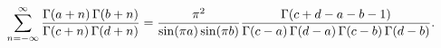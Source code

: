 \[\sum_{n=-\infty}^{\infty}\frac{\mathop{\Gamma\/}\nolimits\!\left(a+n\right)%
\mathop{\Gamma\/}\nolimits\!\left(b+n\right)}{\mathop{\Gamma\/}\nolimits\!%
\left(c+n\right)\mathop{\Gamma\/}\nolimits\!\left(d+n\right)}=\frac{\pi^{2}}{%
\mathop{\sin\/}\nolimits\!\left(\pi a\right)\mathop{\sin\/}\nolimits\!\left(%
\pi b\right)}\*\frac{\mathop{\Gamma\/}\nolimits\!\left(c+d-a-b-1\right)}{%
\mathop{\Gamma\/}\nolimits\!\left(c-a\right)\mathop{\Gamma\/}\nolimits\!\left(%
d-a\right)\mathop{\Gamma\/}\nolimits\!\left(c-b\right)\mathop{\Gamma\/}%
\nolimits\!\left(d-b\right)}.\]